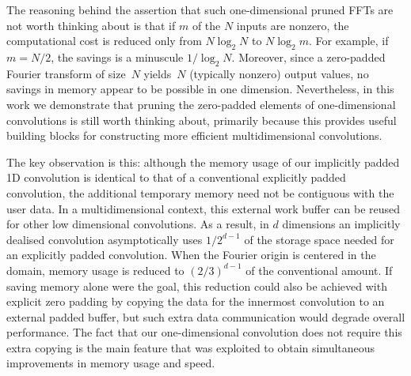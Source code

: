 \documentclass[final]{siamltex}
\begin{document}
The reasoning behind the assertion that such one-dimensional pruned FFTs
are not worth thinking about is that if $m$ of the $N$ inputs are nonzero,
the computational cost is reduced only from $N\log_2 N$ to $N\log_2 m$.
For example, if $m=N/2$, the savings is a minuscule $1/\log_2 N$.
Moreover, since a zero-padded Fourier transform of size~$N$ yields~$N$
(typically nonzero) output values, no savings in memory appear to be
possible in one dimension. Nevertheless, in this work we demonstrate that
pruning the zero-padded elements of one-dimensional convolutions is still
worth thinking about, primarily because this provides useful building blocks
for constructing more efficient multidimensional convolutions.

The key observation is this: although the memory usage of our implicitly
padded 1D convolution is identical to that of a conventional explicitly
padded convolution, the additional temporary memory need not be contiguous
with the user data.  In a multidimensional context, this external work
buffer can be reused for other low dimensional convolutions.
As a result, in $d$ dimensions an implicitly dealised convolution
asymptotically uses $1/2^{d-1}$ of the
storage space needed for an explicitly padded convolution. When the Fourier origin is
centered in the domain, memory usage is reduced to $(2/3)^{d-1}$ of the
conventional amount.
If saving memory alone were the goal, this reduction could
also be achieved with explicit zero padding by copying the data for the
innermost convolution to an external padded buffer, but such extra data
communication would degrade overall performance. The fact that our
one-dimensional convolution does not require this extra copying is the
main feature that was exploited to obtain simultaneous improvements in
memory usage and speed.
\end{document}

